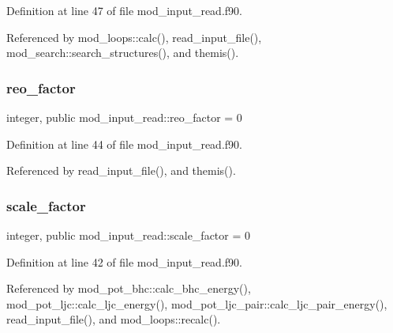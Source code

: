 Definition at line 47 of file mod\+\_\+input\+\_\+read.\+f90.



Referenced by mod\+\_\+loops\+::calc(), read\+\_\+input\+\_\+file(), mod\+\_\+search\+::search\+\_\+structures(), and themis().

\mbox{\label{namespacemod__input__read_ab81a502be00c6796c9474d728db96041}} 
\subsubsection{\texorpdfstring{reo\+\_\+factor}{reo\_factor}}
{\footnotesize\ttfamily integer, public mod\+\_\+input\+\_\+read\+::reo\+\_\+factor = 0}



Definition at line 44 of file mod\+\_\+input\+\_\+read.\+f90.



Referenced by read\+\_\+input\+\_\+file(), and themis().

\mbox{\label{namespacemod__input__read_a55be21acb2dc4800c8d3cecf28e4166f}} 
\subsubsection{\texorpdfstring{scale\+\_\+factor}{scale\_factor}}
{\footnotesize\ttfamily integer, public mod\+\_\+input\+\_\+read\+::scale\+\_\+factor = 0}



Definition at line 42 of file mod\+\_\+input\+\_\+read.\+f90.



Referenced by mod\+\_\+pot\+\_\+bhc\+::calc\+\_\+bhc\+\_\+energy(), mod\+\_\+pot\+\_\+ljc\+::calc\+\_\+ljc\+\_\+energy(), mod\+\_\+pot\+\_\+ljc\+\_\+pair\+::calc\+\_\+ljc\+\_\+pair\+\_\+energy(), read\+\_\+input\+\_\+file(), and mod\+\_\+loops\+::recalc().

\mbox{\label{namespacemod__input__read_a584082766fe740d0c5f3975d3d44426b}} 
